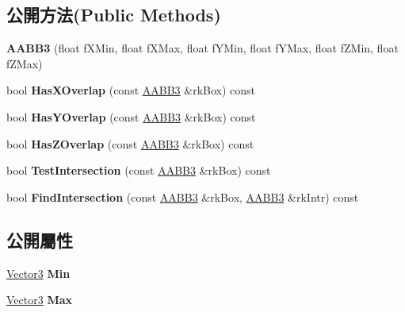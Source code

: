 \subsection*{公開方法(Public Methods)}
\begin{DoxyCompactItemize}
\item 
{\bfseries A\+A\+B\+B3} (float f\+X\+Min, float f\+X\+Max, float f\+Y\+Min, float f\+Y\+Max, float f\+Z\+Min, float f\+Z\+Max)\hypertarget{class_magnum_1_1_a_a_b_b3_acd9ad9724d416ff7d29b0b9485d1975d}{}\label{class_magnum_1_1_a_a_b_b3_acd9ad9724d416ff7d29b0b9485d1975d}

\item 
bool {\bfseries Has\+X\+Overlap} (const \hyperlink{class_magnum_1_1_a_a_b_b3}{A\+A\+B\+B3} \&rk\+Box) const \hypertarget{class_magnum_1_1_a_a_b_b3_a7020a1d74b38fc9cdae2cc38a1612a3b}{}\label{class_magnum_1_1_a_a_b_b3_a7020a1d74b38fc9cdae2cc38a1612a3b}

\item 
bool {\bfseries Has\+Y\+Overlap} (const \hyperlink{class_magnum_1_1_a_a_b_b3}{A\+A\+B\+B3} \&rk\+Box) const \hypertarget{class_magnum_1_1_a_a_b_b3_afdc299452ba1d6e634a68fc0f4e24610}{}\label{class_magnum_1_1_a_a_b_b3_afdc299452ba1d6e634a68fc0f4e24610}

\item 
bool {\bfseries Has\+Z\+Overlap} (const \hyperlink{class_magnum_1_1_a_a_b_b3}{A\+A\+B\+B3} \&rk\+Box) const \hypertarget{class_magnum_1_1_a_a_b_b3_a3f7cd5ab04bc413a88e099208437b31c}{}\label{class_magnum_1_1_a_a_b_b3_a3f7cd5ab04bc413a88e099208437b31c}

\item 
bool {\bfseries Test\+Intersection} (const \hyperlink{class_magnum_1_1_a_a_b_b3}{A\+A\+B\+B3} \&rk\+Box) const \hypertarget{class_magnum_1_1_a_a_b_b3_af7fb33b1675667b506809bfb6b7f50eb}{}\label{class_magnum_1_1_a_a_b_b3_af7fb33b1675667b506809bfb6b7f50eb}

\item 
bool {\bfseries Find\+Intersection} (const \hyperlink{class_magnum_1_1_a_a_b_b3}{A\+A\+B\+B3} \&rk\+Box, \hyperlink{class_magnum_1_1_a_a_b_b3}{A\+A\+B\+B3} \&rk\+Intr) const \hypertarget{class_magnum_1_1_a_a_b_b3_ae83c7947f08558af7c273b00002331aa}{}\label{class_magnum_1_1_a_a_b_b3_ae83c7947f08558af7c273b00002331aa}

\end{DoxyCompactItemize}
\subsection*{公開屬性}
\begin{DoxyCompactItemize}
\item 
\hyperlink{class_magnum_1_1_vector3}{Vector3} {\bfseries Min}\hypertarget{class_magnum_1_1_a_a_b_b3_a35ea156ec5b68ff3ffeb602141e0eb6a}{}\label{class_magnum_1_1_a_a_b_b3_a35ea156ec5b68ff3ffeb602141e0eb6a}

\item 
\hyperlink{class_magnum_1_1_vector3}{Vector3} {\bfseries Max}\hypertarget{class_magnum_1_1_a_a_b_b3_ab9a11ccba6936eca7c30cae0af221910}{}\label{class_magnum_1_1_a_a_b_b3_ab9a11ccba6936eca7c30cae0af221910}

\end{DoxyCompactItemize}



